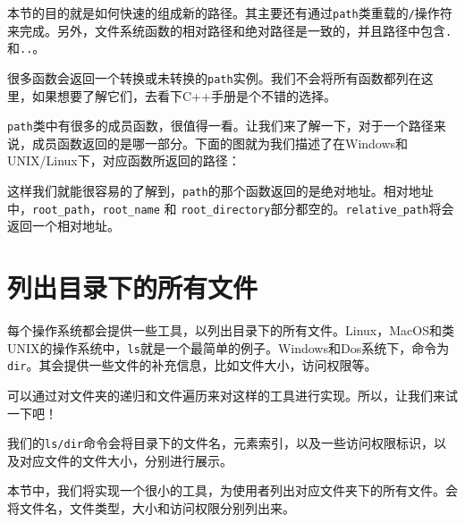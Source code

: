 
本节的目的就是如何快速的组成新的路径。其主要还有通过\texttt{path}类重载的\texttt{/}操作符来完成。另外，文件系统函数的相对路径和绝对路径是一致的，并且路径中包含\texttt{.}和\texttt{..}。

很多函数会返回一个转换或未转换的\texttt{path}实例。我们不会将所有函数都列在这里，如果想要了解它们，去看下C++手册是个不错的选择。

\texttt{path}类中有很多的成员函数，很值得一看。让我们来了解一下，对于一个路径来说，成员函数返回的是哪一部分。下面的图就为我们描述了在Windows和UNIX/Linux下，对应函数所返回的路径：


这样我们就能很容易的了解到，\texttt{path}的那个函数返回的是绝对地址。相对地址中，\texttt{root\_path}，\texttt{root\_name} 和 \texttt{root\_directory}部分都空的。\texttt{relative\_path}将会返回一个相对地址。


\section{列出目录下的所有文件}

每个操作系统都会提供一些工具，以列出目录下的所有文件。Linux，MacOS和类UNIX的操作系统中，\texttt{ls}就是一个最简单的例子。Windows和Dos系统下，命令为\texttt{dir}。其会提供一些文件的补充信息，比如文件大小，访问权限等。

可以通过对文件夹的递归和文件遍历来对这样的工具进行实现。所以，让我们来试一下吧！

我们的\texttt{ls/dir}命令会将目录下的文件名，元素索引，以及一些访问权限标识，以及对应文件的文件大小，分别进行展示。


本节中，我们将实现一个很小的工具，为使用者列出对应文件夹下的所有文件。会将文件名，文件类型，大小和访问权限分别列出来。

